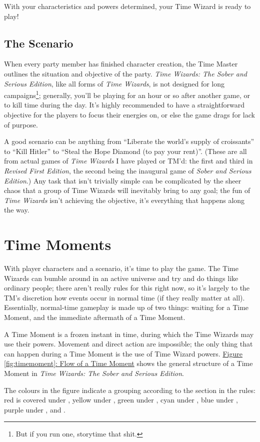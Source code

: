\documentclass[twoside]{article}
\newcommand{\twsse}{\emph{Time Wizards: The Sober and Serious Edition}}
\newcommand{\tw}{\emph{Time Wizards}}
\newcommand{\sse}{\emph{Sober and Serious Edition}}
\newcommand{\rfe}{\emph{Revised First Edition}}
\begin{document}
With your characteristics and powers determined, your Time Wizard is ready to play!

\subsection{The Scenario} \label{ssec:scenario}
When every party member has finished character creation, the Time Master outlines the situation
and objective of the party. \twsse{}, like all forms of \tw{}, is not designed for long
campaigns\footnote{But if you run one, storytime that shit.}; generally, you'll be playing for
an hour or so after another game, or to kill time during the day. It's highly recommended to
have a straightforward objective for the players to focus their energies on, or else the game
drags for lack of purpose.

A good scenario can be anything from ``Liberate the world's supply of croissants'' to ``Kill
Hitler'' to ``Steal the Hope Diamond (to pay your rent)''. (These are all from actual games of
\tw{} I have played or TM'd: the first and third in \rfe{}, the second being the inaugural game
of \sse{}.) Any task that isn't trivially simple can be complicated by the sheer chaos that a
group of Time Wizards will inevitably bring to any goal; the fun of \tw{} isn't achieving the
objective, it's everything that happens along the way.

\section{Time Moments} \label{sec:time-moment}
With player characters and a scenario, it's time to play the game. The Time Wizards can bumble
around in an active universe and try and do things like ordinary people; there aren't really
rules for this right now, so it's largely to the TM's discretion how events occur in normal time
(if they really matter at all). Essentially, normal-time gameplay is made up of two things:
waiting for a Time Moment, and the immediate aftermath of a Time Moment.

A Time Moment is a frozen instant in time, during which the Time Wizards may use their powers.
Movement and direct action are impossible; the only thing that can happen during a Time Moment
is the use of Time Wizard powers. \hyperref[fig:timemoment]{Figure \ref*{fig:timemoment}: Flow
of a Time Moment} shows the general structure of a Time Moment in \twsse{}.

The colours in the figure indicate a grouping according to the section in the rules: red is
covered under , yellow under , green
under , cyan under , blue under
, purple under , and
.
\end{document}
